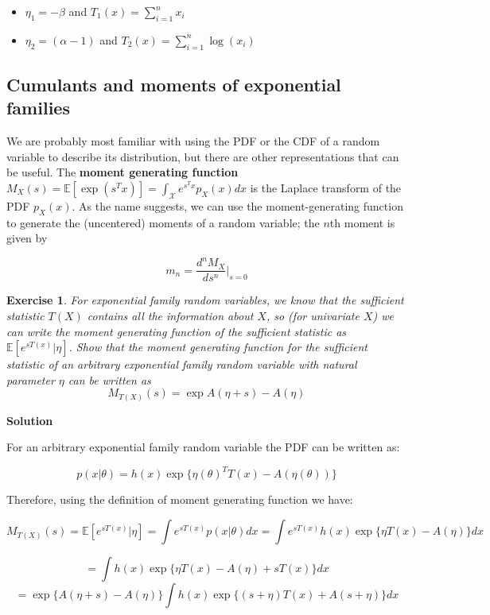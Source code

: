 \documentclass[twoside]{article}
\newcounter{lecnum}
\newtheorem{exercise}{Exercise}[lecnum]
\newcommand\E{\mathbb{E}}
\begin{document}
\begin{itemize}
	\item $\eta_1 = -\beta$ and $T_1(x) =  \sum_{i=1}^{n}x_i $
	\item $\eta_2 = (\alpha -1)$ and $T_2(x) =  \sum_{i=1}^{n}\log (x_i) $
\end{itemize}

 \color{black}
\vspace{20mm}

\subsection{Cumulants and moments of exponential families}

We are probably most familiar with using the PDF or the CDF of a random variable to describe its distribution, but there are other representations that can be useful. The \textbf{moment generating function} $M_X(s) = \E[\exp(s^Tx)] = \int_\mathcal{X} e^{s^Tx}p_X(x) dx$ is the Laplace transform of the PDF $p_X(x)$. As the name suggests, we can use the moment-generating function to generate the (uncentered) moments of a random variable; the $n$th moment is given by

$$m_n = \frac{d^nM_X}{ds^n}\Bigr|_{s=0}$$

\begin{exercise}
  For exponential family random variables, we know that the sufficient statistic $T(X)$ contains all the information about $X$, so (for univariate $X$) we can write the moment generating function of the sufficient statistic as $\E[e^{sT(x)}|\eta]$. Show that the moment generating function for the sufficient statistic of  an arbitrary exponential family random variable with natural parameter $\eta$ can be written as
    $$M_{T(X)}(s) = \exp{A(\eta+s) - A(\eta)}$$
\end{exercise}

 \color{blue}
\textbf{Solution}

For an arbitrary exponential family random variable the PDF can be written as:

$$p(x|\theta) = h(x)\exp\{\eta(\theta)^TT(x) - A(\eta(\theta))\}$$

Therefore, using the definition of moment generating function we have:

$$ M_{T(X)}(s) = \E[e^{sT(x)}|\eta] = \int e^{sT(x)} p(x|\theta) dx = \int e^{sT(x)} h(x)\exp\{ \eta  T(x) - A(\eta)\} dx  $$


$$ = \int h(x)\exp\{\eta T(x) - A(\eta) + sT(x) \} dx $$
$$
 = \exp\{ A(\eta+s) - A(\eta) \} \int h(x)\exp\{ (s + \eta )T(x) +A (s + \eta)   \} dx$$
\end{document}

